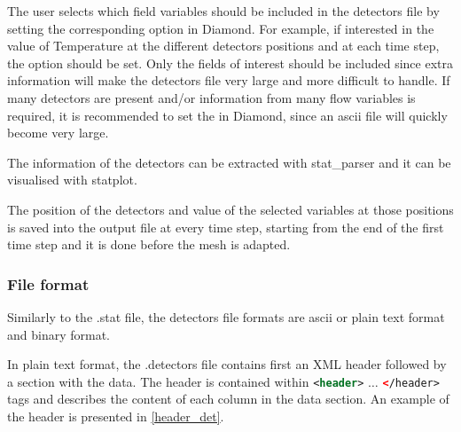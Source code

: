 The user selects which field variables should be included in the detectors file by setting the corresponding option in Diamond. For example, if interested in the value of Temperature at the different detectors positions and at each time step, the option   should be set. Only the fields of interest should be included since extra information will make the detectors file very large and more difficult to handle. If many detectors are present and/or information from many flow variables is required, it is recommended to set the  in Diamond, since an ascii file will quickly become very large.

The information of the detectors can be extracted with stat\_parser and it can be visualised with statplot.

The position of the detectors and value of the selected variables at those positions is saved into the output file at every time step, starting from the end of the first time step and it is done before the mesh is adapted.

\subsubsection{File format}
\label{sec:detectors_output}
Similarly to the .stat file, the detectors file formats are ascii or plain text format and binary format.

In plain text format, the .detectors file contains first an XML header followed by a section with the data. The header is contained within \lstinline[language = XML]*<header>* $\ldots$
\lstinline[language = XML]*</header>* tags and describes the content of each column in the data section. An example of the header is presented in \ref{header_det}.

